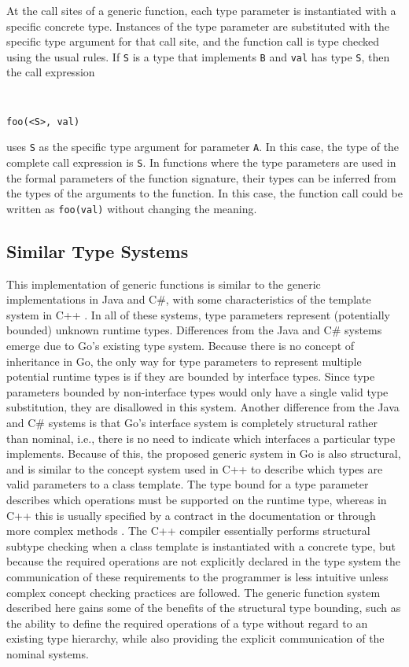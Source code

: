 \documentclass[letterpaper,twocolumn,11pt]{article}
\begin{document}
At the call sites of a generic function, each type parameter is instantiated with a specific concrete type. Instances of the type parameter are substituted with the specific type argument for that call site, and the function call is type checked using the usual rules. If \texttt{S} is a type that implements \texttt{B} and \texttt{val} has type \texttt{S}, then the call expression
{ \tt \small
\begin{verbatim}
foo(<S>, val)
\end{verbatim}
}
uses \texttt{S} as the specific type argument for parameter \texttt{A}. In this case, the type of the complete call expression is \texttt{S}. In functions where the type parameters are used in the formal parameters of the function signature, their types can be inferred from the types of the arguments to the function. In this case, the function call could be written as \texttt{foo(val)} without changing the meaning.

\subsection{Similar Type Systems} \label{similar_type_systems}

This implementation of generic functions is similar to the generic implementations in Java and C\#, with some characteristics of the template system in C++ \cite{ghosh2004generics} \cite{csharp}. In all of these systems, type parameters represent (potentially bounded) unknown runtime types. Differences from the Java and C\# systems emerge due to Go's existing type system. Because there is no concept of inheritance in Go, the only way for type parameters to represent multiple potential runtime types is if they are bounded by interface types. Since type parameters bounded by non-interface types would only have a single valid type substitution, they are disallowed in this system. Another difference from the Java and C\# systems is that Go's interface system is completely structural rather than nominal, i.e., there is no need to indicate which interfaces a particular type implements. Because of this, the proposed generic system in Go is also structural, and is similar to the concept system used in C++ to describe which types are valid parameters to a class template. The type bound for a type parameter describes which operations must be supported on the runtime type, whereas in C++ this is usually specified by a contract in the documentation or through more complex methods \cite{siek2000concept}. The C++ compiler essentially performs structural subtype checking when a class template is instantiated with a concrete type, but because the required operations are not explicitly declared in the type system the communication of these requirements to the programmer is less intuitive unless complex concept checking practices are followed. The generic function system described here gains some of the benefits of the structural type bounding, such as the ability to define the required operations of a type without regard to an existing type hierarchy, while also providing the explicit communication of the nominal systems.
\end{document}
